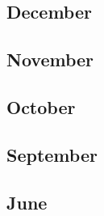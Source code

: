 \documentclass[12pt]{article}
\begin{document}
\subsection{December}
\begin{refsection}
    \nocite{iyer_opt-iml_2023}
    \printbibliography[heading=none]
\end{refsection}

\subsection{November}
\begin{refsection}
    \nocite{liang_holistic_2023}
    \nocite{workshop_bloom_2023}
    \nocite{taylor_galactica_2022}
    \printbibliography[heading=none]
\end{refsection}

\subsection{October}
\begin{refsection}
    \nocite{chung_scaling_2022}
    \nocite{zeng_glm-130b_2023}
    \printbibliography[heading=none]
\end{refsection}

\subsection{September}
\begin{refsection}
    \nocite{glaese_improving_2022}
    \printbibliography[heading=none]
\end{refsection}

\subsection{June}
\begin{refsection}
    \nocite{wei_emergent_nodate}
    \nocite{hao2022languagemodelsgeneralpurposeinterfaces}
    \nocite{noauthor_googlebig-bench_2025}
    \printbibliography[heading=none]
\end{refsection}
\end{document}

